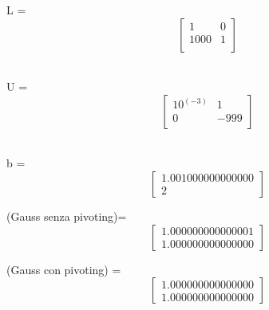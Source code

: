 


L = 
\[\begin{bmatrix}
	1    & 0 \\
	1000 & 1 \\
\end{bmatrix}\]
\

U = 
\[\begin{bmatrix}
	10^(-3) & 1    \\
	0       & -999 \\
\end{bmatrix}\]
\

b = 
\[\begin{bmatrix}
	1.001000000000000 \\
	2                 
\end{bmatrix}\]

(Gauss senza pivoting)= 
\[\begin{bmatrix}
	1.000000000000001 \\
	1.000000000000000 
\end{bmatrix}\]

(Gauss con pivoting) = 
\[\begin{bmatrix}
	1.000000000000000 \\
	1.000000000000000 
\end{bmatrix}\]